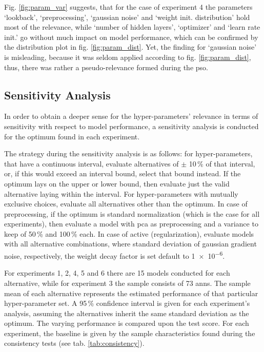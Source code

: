 Fig. \ref{fig:param_var} suggests, that for the case of experiment 4 the parameters `lookback', `preprocessing', `gaussian noise' and `weight init. distribution' hold most of the relevance, while `number of hidden layers', `optimizer' and `learn rate init.' go without much impact on model performance, which can be confirmed by the distribution plot in fig. \ref{fig:param_dist}.
Yet, the finding for `gaussian noise' is misleading, because it was seldom applied according to fig. \ref{fig:param_dist}, thus, there was rather a pseudo-relevance formed during the \gls{pso}.


\subsection{Sensitivity Analysis}
In order to obtain a deeper sense for the hyper-parameters' relevance in terms of sensitivity with respect to model performance, a sensitivity analysis is conducted for the optimum found in each experiment.

The strategy during the sensitivity analysis is as follows:
for hyper-parameters, that have a continuous interval, evaluate alternatives of $\pm$ 10\,\% of that interval, or, if this would exceed an interval bound, select that bound instead.
If the optimum lays on the upper or lower bound, then evaluate just the valid alternative laying within the interval.
For hyper-parameters with mutually exclusive choices, evaluate all alternatives other than the optimum.
In case of preprocessing, if the optimum is standard normalization (which is the case for all experiments), then evaluate a model with \gls{pca} as preprocessing and a variance to keep of 50\,\% and 100\,\% each.
In case of active (regularization), evaluate models with all alternative combinations, where standard deviation of gaussian gradient noise, respectively, the weight decay factor is set default to \num{1e-6}.

For experiments 1, 2, 4, 5 and 6 there are 15 models conducted for each alternative, while for experiment 3 the sample consists of 73 \glspl{ann}.
The sample mean of each alternative represents the estimated performance of that particular hyper-parameter set.
A 95\,\% confidence interval is given for each experiment's analysis, assuming the alternatives inherit the same standard deviation as the optimum.
The varying performance is compared upon the test score.
For each experiment, the baseline is given by the sample characteristics found during the consistency tests (see tab. \ref{tab:consistency}).

